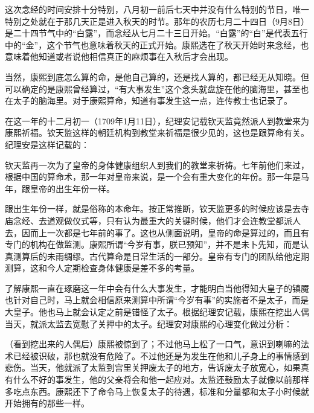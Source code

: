 
这次念经的时间安排十分特别，八月初一前后七天中并没有什么特别的节日，唯一特别之处就在于那几天正是进入秋天的时节。那年的农历七月二十四日（9月8日）是二十四节气中的“白露”，而念经从七月二十三日开始。“白露”的“白”是代表五行中的“金”，这个节气也意味着秋天的正式开始。康熙选在了秋天开始时来念经，也意味着他知道或者说他相信真正的麻烦事在入秋后才会出现。



当然，康熙到底怎么算的命，是他自己算的，还是找人算的，都已经无从知晓。但可以确定的是康熙曾经算过，“有大事发生”这个念头就盘旋在他的脑海里，甚至也在太子的脑海里。对于康熙算命，知道有事发生这一点，连传教士也记录了。



在这一年的十二月初一（1709年1月11日），纪理安记载钦天监竟然派人到教堂来为康熙祈福。钦天监这样的朝廷机构到教堂来祈福是很少见的，这也是跟算命有关。纪理安是这样记载的：



\begin{bookquote}钦天监再一次为了皇帝的身体健康组织人到我们的教堂来祈祷。七年前他们来过，根据中国的算命术，那一年对皇帝来说，是一个会有重大变化的年份。那一年是马年，跟皇帝的出生年份一样。\end{bookquote}


跟出生年份一样，就是俗称的本命年。按正常推断，钦天监更多的时候应该是去寺庙念经、去道观做仪式等，只有认为最重大的关键时候，他们才会连教堂都派人去，因而上一次都是七年前的事了。这也从侧面说明，皇帝的命是算过的，而且有专门的机构在做监测。康熙所谓“今岁有事，朕已预知”，并不是未卜先知，而是认真测算后的未雨绸缪。古代算命是日常生活的一部分。皇帝有专门的团队给他定期测算，这和今人定期检查身体健康是差不多的考量。



了解康熙一直在琢磨这一年中会有什么大事发生，才能明白当他得知大皇子的镇魇也针对自己时，马上就会相信原来测算中所谓“今岁有事”的实施者不是太子，而是大皇子。他也马上就会认定之前是错怪了太子。根据纪理安记载，康熙在挖出人偶当天，就派太监去宽慰了关押中的太子。纪理安对康熙的心理变化做过分析：



\begin{bookquote}（看到挖出来的人偶后）康熙被惊到了；不过他马上松了一口气，意识到喇嘛的法术已经被识破，那也就没有危险了。不过他还是为发生在他和儿子身上的事情感到悲伤。当天，他就派了太监到宫里关押废太子的地方，告诉废太子放宽心，如果真有什么不好的事发生，他的父亲将会和他一起应对。太监还鼓励太子就像以前那样多吃点东西。康熙还下了命令马上恢复太子的待遇，标准和分量都和太子小时候就开始拥有的那些一样。\end{bookquote}

